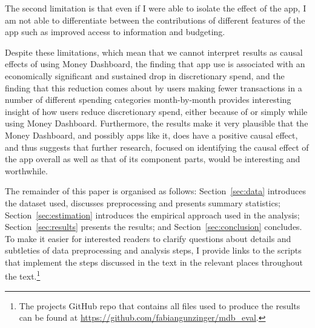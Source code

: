 The second limitation is that even if I were able to isolate the effect of
the app, I am not able to differentiate between the contributions of different
features of the app such as improved access to information and budgeting.

Despite these limitations, which mean that we cannot interpret results as
causal effects of using Money Dashboard, the finding that app use is associated
with an economically significant and sustained drop in discretionary spend, and
the finding that this reduction comes about by users making fewer transactions
in a number of different spending categories month-by-month provides
interesting insight of how users reduce discretionary spend, either because of
or simply while using Money Dashboard. Furthermore, the results make it very
plausible that the Money Dashboard, and possibly apps like it, does have a
positive causal effect, and thus suggests that further research, focused on
identifying the causal effect of the app overall as well as that of its
component parts, would be interesting and worthwhile.

The remainder of this paper is organised as follows: Section~\ref{sec:data}
introduces the dataset used, discusses preprocessing and presents summary
statistics; Section~\ref{sec:estimation} introduces the empirical approach used
in the analysis; Section~\ref{sec:results} presents the results; and
Section~\ref{sec:conclusion} concludes. To make it easier for interested
readers to clarify questions about details and subtleties of data preprocessing
and analysis steps, I provide links to the scripts that implement the steps
discussed in the text in the relevant places throughout the text.\footnote{The
    projects GitHub repo that contains all files used to produce the results
    can be found at
\href{https://github.com/fabiangunzinger/mdb\_eval}{https://github.com/fabiangunzinger/mdb\_eval}.}

